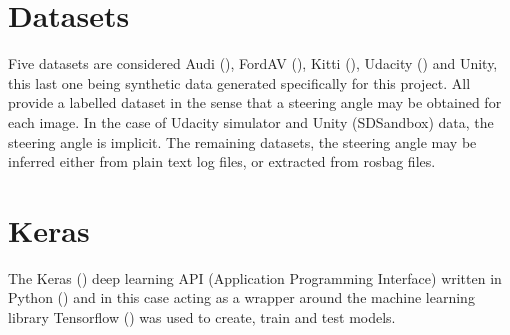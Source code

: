 


\section{Datasets}
Five datasets are considered Audi (\cite{geyer2020a2d2}), FordAV (\cite{agarwal2020ford}), Kitti (\cite{geiger2013vision}), Udacity (\cite{udacity2020}) and Unity, this last one being synthetic data generated specifically for this project. All provide a labelled dataset in the sense that a steering angle may be obtained for each image. In the case of Udacity simulator and Unity (SDSandbox) data, the steering angle is implicit. The remaining datasets, the steering angle may be inferred either from plain text log files, or extracted from rosbag files.

\section{Keras}
The Keras (\cite{chollet2015keras}) deep learning API (Application Programming Interface) written in Python (\cite{van1995python}) and in this case acting as a wrapper around the machine learning library Tensorflow (\cite{abadi2016tensorflow})  was used to create, train and test models.


